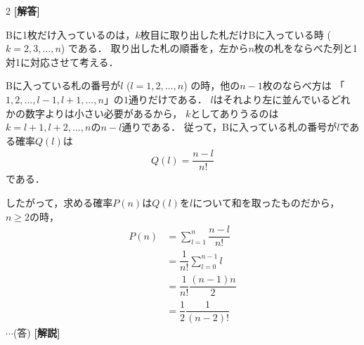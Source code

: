 \documentclass[../../main.tex]{subfiles}
\begin{document}
\setcounter{equation}{0}
\begin{oframed}
  
\end{oframed}
\setlength{\columnseprule}{0.4pt}
\begin{multicols}{2}
  {\bf [解答]}

  Bに1枚だけ入っているのは，$k$枚目に取り出した札だけBに入っている時 ($k=2,3,\dots,n$) である．
  取り出した札の順番を，左から$n$枚の札をならべた列と1対1に対応させて考える．

  Bに入っている札の番号が$l$ ($l=1,2,\dots,n$) の時，他の$n-1$枚のならべ方は
  「$1,2,\dots,l-1,l+1,\dots,n$」の$1$通りだけである．
  $l$はそれより左に並んでいるどれかの数字よりは小さい必要があるから，
  $k$としてありうるのは$k=l+1,l+2,\dots,n$の$n-l$通りである．
  従って，Bに入っている札の番号が$l$である確率$Q(l)$は
  \begin{align}
    Q(l) = \dfrac{n-l}{n!}
  \end{align}
  である．

  したがって，求める確率$P(n)$は$Q(l)$を$l$について和を取ったものだから，$n \ge 2$の時，
  \begin{align}
    P(n)
    & = \sum_{l=1}^{n} \dfrac{n-l}{n!}   \\
    & = \dfrac{1}{n!} \sum_{l=0}^{n-1} l \\
    & = \dfrac{1}{n!} \dfrac{(n-1)n}{2}   \\
    & = \dfrac{1}{2}\dfrac{1}{(n-2)!}
  \end{align}
  $\cdots$(答)
  {\bf [解説]}

  \newpage
\end{multicols}
\end{document}
